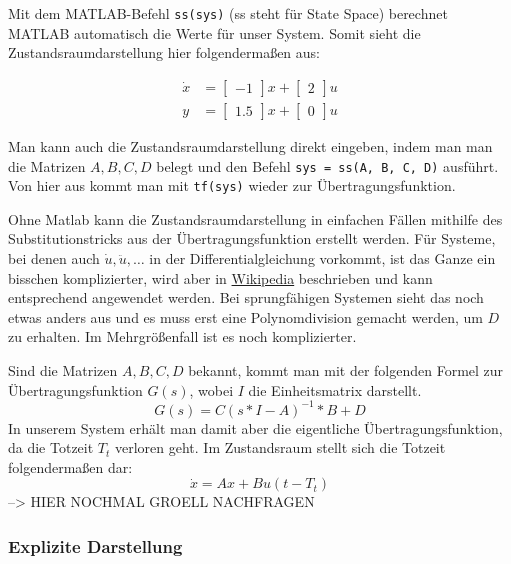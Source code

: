 Mit dem MATLAB-Befehl \texttt{ss(sys)} (ss steht für State Space) berechnet MATLAB automatisch die Werte für unser System. Somit sieht die Zustandsraumdarstellung hier folgendermaßen aus:

\begin{subequations}
    \begin{align}
        \dot x & = \begin{bmatrix}
            -1
        \end{bmatrix}x + \begin{bmatrix}
            2
        \end{bmatrix}u \\
        y & = \begin{bmatrix}
            1.5
        \end{bmatrix}x + \begin{bmatrix}
            0
        \end{bmatrix}u
    \end{align}
\end{subequations}


Man kann auch die Zustandsraumdarstellung direkt eingeben, indem man man die Matrizen $A, B, C, D$ belegt und den Befehl \texttt{sys = ss(A, B, C, D)} ausführt. Von hier aus kommt man mit \texttt{tf(sys)} wieder zur Übertragungsfunktion.

Ohne Matlab kann die Zustandsraumdarstellung in einfachen Fällen mithilfe des Substitutionstricks aus der Übertragungsfunktion erstellt werden. Für Systeme, bei denen auch $\dot u, \ddot u, \ldots$ in der Differentialgleichung vorkommt, ist das Ganze ein bisschen komplizierter, wird aber in \href{https://de.wikipedia.org/wiki/Zustandsraumdarstellung#Regelungsnormalform}{Wikipedia} beschrieben und kann entsprechend angewendet werden. Bei sprungfähigen Systemen sieht das noch etwas anders aus und es muss erst eine Polynomdivision gemacht werden, um $D$ zu erhalten. Im Mehrgrößenfall ist es noch komplizierter.

Sind die Matrizen $A, B, C, D$ bekannt, kommt man mit der folgenden Formel zur Übertragungsfunktion $G(s)$, wobei $I$ die Einheitsmatrix darstellt.
\[
    G(s) = C(s * I - A)^{-1} * B + D
\]
In unserem System erhält man damit aber die eigentliche Übertragungsfunktion, da die Totzeit $T_t$ verloren geht. Im Zustandsraum stellt sich die Totzeit folgendermaßen dar:
\[
    \dot x = Ax + Bu(t - T_t)
\]
--> HIER NOCHMAL GROELL NACHFRAGEN

\subsubsection*{Explizite Darstellung}

